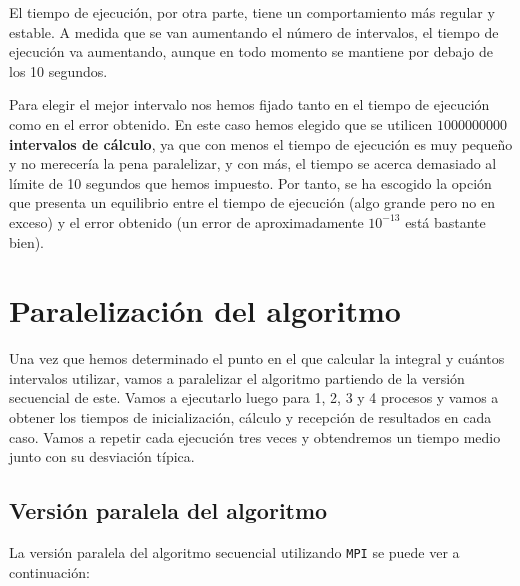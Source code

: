 \documentclass[11pt,a4paper]{article}
\begin{document}
El tiempo de ejecución, por otra parte, tiene un comportamiento más regular y estable.
A medida que se van aumentando el número de intervalos, el tiempo de ejecución va aumentando,
aunque en todo momento se mantiene por debajo de los 10 segundos.

Para elegir el mejor intervalo nos hemos fijado tanto en el tiempo de ejecución como en el
error obtenido. En este caso hemos elegido que se utilicen \textbf{$1000000000$ intervalos de
cálculo}, ya que con menos el tiempo de ejecución es muy pequeño y no merecería la pena
paralelizar, y con más, el tiempo se acerca demasiado al límite de 10 segundos que hemos impuesto.
Por tanto, se ha escogido la opción que presenta un equilibrio entre el tiempo de ejecución (algo
grande pero no en exceso) y el error obtenido (un error de aproximadamente $10^{-13}$ está
bastante bien).

\section{Paralelización del algoritmo}

Una vez que hemos determinado el punto en el que calcular la integral y cuántos intervalos
utilizar, vamos a paralelizar el algoritmo partiendo de la versión secuencial de este. Vamos
a ejecutarlo luego para 1, 2, 3 y 4 procesos y vamos a obtener los tiempos de inicialización,
cálculo y recepción de resultados en cada caso. Vamos a repetir cada ejecución tres veces y
obtendremos un tiempo medio junto con su desviación típica.

\subsection{Versión paralela del algoritmo}

La versión paralela del algoritmo secuencial utilizando \texttt{MPI} se puede ver a continuación:
\end{document}
